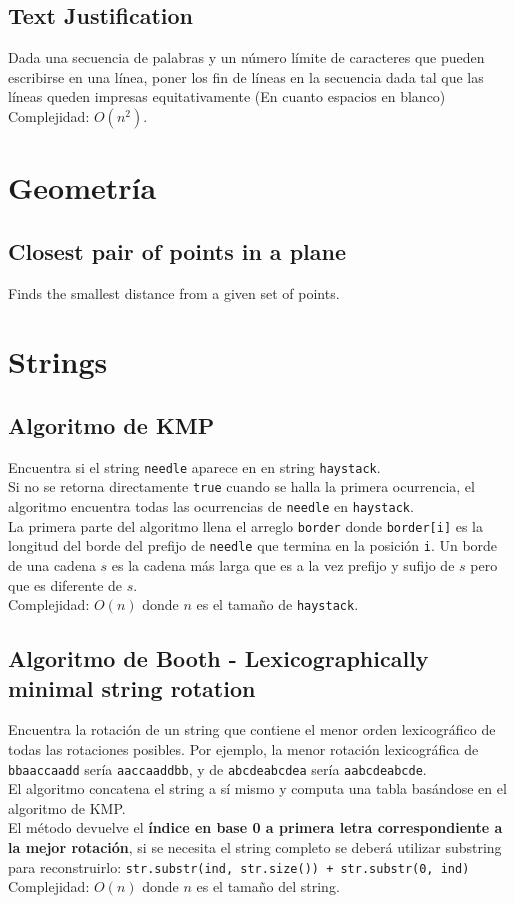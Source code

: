 \documentclass[10pt,letterpaper,twocolumn]{article}
\newcommand{\source}[1]{
	
	\dotfill
}
\begin{document}
	\subsection{Text Justification}
		Dada una secuencia de palabras y un número límite de caracteres
		que pueden escribirse en una línea, poner los fin de líneas en la
		secuencia dada tal que las líneas queden impresas equitativamente
		(En cuanto espacios en blanco)
		Complejidad: $O(n^2)$.
		\source{./src/text_justification.java}

\section{Geometría}
	\subsection{Closest pair of points in a plane}
		Finds the smallest distance from a given set of points.
		\source{./src/closest_pair_points.cpp}

\section{Strings}
	\subsection{Algoritmo de KMP}
		Encuentra si el string \verb|needle| aparece en en string \verb|haystack|.\\
		Si no se retorna directamente \verb|true| cuando se halla la primera ocurrencia, el algoritmo encuentra todas las ocurrencias de \verb|needle| en \verb|haystack|.\\
		La primera parte del algoritmo llena el arreglo \verb|border| donde \verb|border[i]| es la longitud del borde del prefijo de \verb|needle| que termina en la posición \verb|i|. Un borde de una cadena $s$ es la cadena más larga que es a la vez prefijo y sufijo de $s$ pero que es diferente de $s$.\\
		Complejidad: $O(n)$ donde $n$ es el tamaño de \verb|haystack|.\\
		\source{./src/kmp.cpp}

	\subsection{Algoritmo de Booth - Lexicographically minimal string rotation}
		Encuentra la rotación de un string que contiene el menor orden lexicográfico de todas las rotaciones posibles. Por ejemplo, la menor rotación lexicográfica de \texttt{bbaaccaadd} sería \texttt{aaccaaddbb}, y de \texttt{abcdeabcdea} sería \texttt{aabcdeabcde}. \\
		El algoritmo concatena el string a sí mismo y computa una tabla basándose en el algoritmo de KMP.\\
		El método devuelve el \textbf{índice en base 0 a primera letra correspondiente a la mejor rotación}, si se necesita el string completo se deberá utilizar substring para reconstruirlo: \texttt{str.substr(ind, str.size()) + str.substr(0, ind)}\\
Complejidad: $O(n)$ donde $n$ es el tamaño del string.
		\source{./src/booths.cpp}
\end{document}
